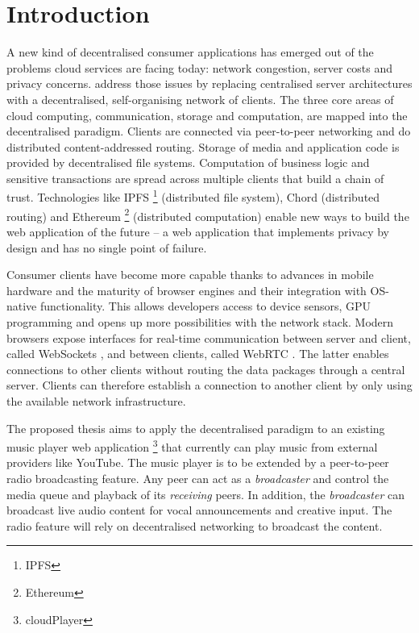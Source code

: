 \section{Introduction}

A new kind of decentralised consumer applications has emerged out of the problems cloud services are facing today: network congestion,
server costs and privacy concerns. \expandafter\MakeUppercase\dApps{} address those issues by replacing centralised server architectures with a decentralised, self-organising network of clients. The three core areas of cloud computing, communication, storage and computation, are mapped into the decentralised paradigm. Clients are connected via peer-to-peer networking and do distributed content-addressed routing. Storage of media and application code is provided by decentralised file systems. Computation of business logic and sensitive transactions are spread across multiple clients that build a chain of trust. Technologies like IPFS \footnote{IPFS} (distributed file system), Chord \cite{chord} (distributed routing) and Ethereum \footnote{Ethereum} (distributed computation) enable new ways to build the web application of the future – a web application that implements privacy by design and has no single point of failure.

Consumer clients have become more capable thanks to advances in mobile hardware and the maturity of browser engines and their integration with OS-native functionality. This allows developers access to device sensors, GPU programming and opens up more possibilities with the network stack. Modern browsers expose interfaces for real-time communication between server and client, called WebSockets \cite{rfc6455}, and between clients, called WebRTC \cite{webRTCpage}. The latter enables connections to other clients without routing the data packages through a central server. Clients can therefore establish a connection to another client by only using the available network infrastructure.

The proposed thesis aims to apply the decentralised paradigm to an existing music player web application \footnote{cloudPlayer} that currently can play music from external providers like YouTube. The music player is to be extended by a peer-to-peer radio broadcasting feature. Any peer can act as a \textit{broadcaster} and control the media queue and playback of its \textit{receiving} peers. In addition, the \textit{broadcaster} can broadcast live audio content for vocal announcements and creative input. The radio feature will rely on decentralised networking to broadcast the content.

